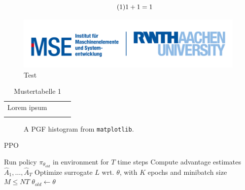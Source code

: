 \begin{equation}\label{eq:1}\tag{1}
    \centering
    1+1 = 1
\end{equation}

\begin{figure}[h]
    \centering
    \includegraphics[width=\textwidth]{images/logo1.png}
    \caption{Test}
\end{figure}

\begin{table}[ht!]
    \caption{Mustertabelle 1}
    \label{test_label}
    \centering
    \begin{tabular}{|p{}|p{}|p{}|p{}|}
    \hline
     &  &  &\\
    \hline
    Lorem ipsum &  &  &\\
    \hline
     &  &  & \\
    \hline
    \end{tabular}
\end{table}


\begin{figure}
    \begin{center}
        
    \end{center}
    \caption{A PGF histogram from \texttt{matplotlib}.}
\end{figure}



\begin{algorithm}
	\caption{PPO} 
	\begin{algorithmic}[1]
				\State Run policy $\pi_{\theta_{old}}$ in environment for $T$ time steps
				\State Compute advantage estimates $\hat{A}_{1},\ldots,\hat{A}_{T}$
			\EndFor
			\State Optimize surrogate $L$ wrt. $\theta$, with $K$ epochs and minibatch size $M\leq NT$
			\State $\theta_{old}\leftarrow\theta$
		\EndFor
	\end{algorithmic} 
\end{algorithm}

